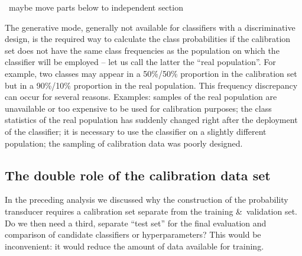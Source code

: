 \documentclass[\ifafour a4paper,12pt,\else a5paper,10pt,\fi%
onecolumn,oneside,article,%
british%
]{memoir}
\theoremstyle{remark}
\theoremstyle{innote}
\newcommand*{\amp}{\&}
\newcommand*{\puzzle}{{\fontencoding{U}\fontfamily{fontawesometwo}\selectfont\symbol{225}}}
\newcommand*{\wrench}{{\fontencoding{U}\fontfamily{fontawesomethree}\selectfont\symbol{114}}}
\newcommand{\mynotew}[1]{{\footnotesize\color{notecolour}\wrench\ #1}}
\newcommand{\mynotez}[1]{{\footnotesize\color{notecolour}\puzzle\ #1}}
\newcommand*{\p}{\mathrm{p}}%
\renewcommand*{\|}[1][]{\nonscript\:#1\vert\nonscript\:\mathopen{}}
\newcommand*{\sect}{\S}%
\begin{document}
\mynotew{maybe move parts below to independent section}

The generative mode, generally not available for classifiers with a discriminative design, is the required way to calculate the class probabilities if the calibration set does not have the same class frequencies as the population on which the classifier will be employed -- let us call the latter the \enquote{real population}. For example, two classes may appear in a 50\%/50\% proportion in the calibration set but in a  90\%/10\% proportion in the real population. This frequency discrepancy can occur for several reasons.  Examples: samples of the real population are unavailable or too expensive to be used for calibration purposes; the class statistics of the real population has suddenly changed right after the deployment of the classifier; it is necessary to use the classifier on a slightly different population; the sampling of calibration data was poorly designed.


\subsection{The double role of the calibration data set}
\label{sec:role_calibration_set}

In the preceding analysis we discussed why the construction of the probability transducer requires a calibration set separate from the training \amp\ validation set. Do we then need a third, separate \enquote{test set} for the final evaluation and comparison of candidate classifiers or hyperparameters? This would be inconvenient: it would reduce the amount of data available for training.
\end{document}
